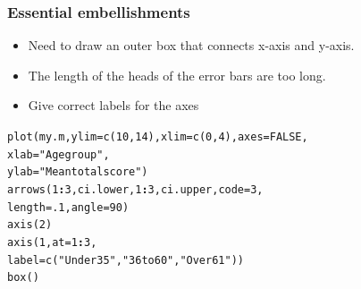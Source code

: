 \documentclass{beamer}\usepackage[]{graphicx}\usepackage[]{color}
\makeatletter
\newcommand{\hlnum}[1]{\textcolor[rgb]{0.533,0,0.133}{#1}}%
\newcommand{\hlstr}[1]{\textcolor[rgb]{0.667,0.267,0}{#1}}%
\newcommand{\hlopt}[1]{\textcolor[rgb]{0,0,0}{\textbf{#1}}}%
\newcommand{\hlstd}[1]{\textcolor[rgb]{0,0,0}{#1}}%
\newcommand{\hlkwc}[1]{\textcolor[rgb]{0,0,0.4}{#1}}%
\newcommand{\hlkwd}[1]{\textcolor[rgb]{0,0.267,0.4}{#1}}%
\newenvironment{kframe}{%
 \def\at@end@of@kframe{}%
 \ifinner\ifhmode%
  \def\at@end@of@kframe{\end{minipage}}%
  \begin{minipage}{\columnwidth}%
 \fi\fi%
 \def\FrameCommand##1{\hskip\@totalleftmargin \hskip-\fboxsep
 \colorbox{shadecolor}{##1}\hskip-\fboxsep
     \hskip-\linewidth \hskip-\@totalleftmargin \hskip\columnwidth}%
 \MakeFramed {\advance\hsize-\width
   \@totalleftmargin\z@ \linewidth\hsize
   \@setminipage}}%
 {\par\unskip\endMakeFramed%
 \at@end@of@kframe}
\newenvironment{knitrout}{}{} %
\makeatother
\begin{document}
\begin{frame}[fragile]
  \frametitle{Essential embellishments}
\begin{itemize}
\item Need to draw an outer box that connects x-axis and y-axis.
\item The length of the heads of the error bars are too long.
\item Give correct labels for the axes 
\end{itemize}
\begin{knitrout}
\color{fgcolor}\begin{kframe}
\begin{alltt}
\hlkwd{plot}\hlstd{(my.m,} \hlkwc{ylim} \hlstd{=} \hlkwd{c}\hlstd{(}\hlnum{10}\hlstd{,} \hlnum{14}\hlstd{),} \hlkwc{xlim} \hlstd{=} \hlkwd{c}\hlstd{(}\hlnum{0}\hlstd{,} \hlnum{4}\hlstd{),} \hlkwc{axes} \hlstd{=} \hlnum{FALSE}\hlstd{,}
     \hlkwc{xlab} \hlstd{=} \hlstr{"Age group"}\hlstd{,}
     \hlkwc{ylab} \hlstd{=} \hlstr{"Mean total score"}\hlstd{)}
\hlkwd{arrows}\hlstd{(}\hlnum{1}\hlopt{:}\hlnum{3}\hlstd{, ci.lower,} \hlnum{1}\hlopt{:}\hlnum{3}\hlstd{, ci.upper,} \hlkwc{code} \hlstd{=} \hlnum{3}\hlstd{,}
       \hlkwc{length} \hlstd{=} \hlnum{.1}\hlstd{,} \hlkwc{angle} \hlstd{=} \hlnum{90}\hlstd{)}
\hlkwd{axis}\hlstd{(}\hlnum{2}\hlstd{)}
\hlkwd{axis}\hlstd{(}\hlnum{1}\hlstd{,} \hlkwc{at} \hlstd{=} \hlnum{1}\hlopt{:}\hlnum{3}\hlstd{,}
     \hlkwc{label} \hlstd{=} \hlkwd{c}\hlstd{(}\hlstr{"Under 35"}\hlstd{,} \hlstr{"36 to 60"}\hlstd{,} \hlstr{"Over 61"}\hlstd{))}
\hlkwd{box}\hlstd{()}
\end{alltt}
\end{kframe}
\end{knitrout}
\end{frame}
\end{document}
